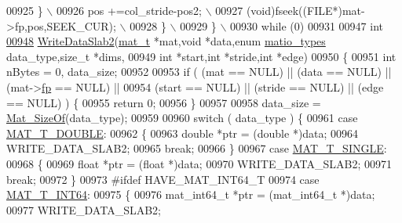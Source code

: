 \begin{DoxyCode}
{{{{00925 \textcolor{preprocessor}{            \} \(\backslash\)}
00926 \textcolor{preprocessor}{            pos +=col\_stride-pos2; \(\backslash\)}
00927 \textcolor{preprocessor}{            (void)fseek((FILE*)mat->fp,pos,SEEK\_CUR); \(\backslash\)}
00928 \textcolor{preprocessor}{        \} \(\backslash\)}
00929 \textcolor{preprocessor}{    \} \(\backslash\)}
00930 \textcolor{preprocessor}{    while (0)}
00931 
00947 \textcolor{keywordtype}{int}
\hyperlink{mat5_8c_a04eba34668a0de871c4f245702f802f7}{00948} \hyperlink{mat5_8c_a04eba34668a0de871c4f245702f802f7}{WriteDataSlab2}(\hyperlink{struct__mat__t}{mat\_t} *mat,\textcolor{keywordtype}{void} *data,\textcolor{keyword}{enum} \hyperlink{group___m_a_t_gacf7b3b879282b7ab3a51190e49bf3453}{matio\_types} data\_type,\textcolor{keywordtype}{size\_t} *dims,
00949     \textcolor{keywordtype}{int} *start,\textcolor{keywordtype}{int} *stride,\textcolor{keywordtype}{int} *edge)
00950 \{
00951     \textcolor{keywordtype}{int} nBytes = 0, data\_size;
00952 
00953     \textcolor{keywordflow}{if} ( (mat   == NULL) || (data   == NULL) || (mat->\hyperlink{struct__mat__t_a85f562e407ca9ad4d2a6e14f839432b7}{fp} == NULL) ||
00954          (start == NULL) || (stride == NULL) || (edge    == NULL) ) \{
00955         \textcolor{keywordflow}{return} 0;
00956     \}
00957 
00958     data\_size = \hyperlink{group__mat__util_gab6774aabdc124c540c1e7686d0804940}{Mat\_SizeOf}(data\_type);
00959 
00960     \textcolor{keywordflow}{switch} ( data\_type ) \{
00961         \textcolor{keywordflow}{case} \hyperlink{group___m_a_t_ggacf7b3b879282b7ab3a51190e49bf3453a31e721ecf7e188196f83c32838288797}{MAT\_T\_DOUBLE}:
00962         \{
00963             \textcolor{keywordtype}{double} *ptr = (\textcolor{keywordtype}{double} *)data;
00964             WRITE\_DATA\_SLAB2;
00965             \textcolor{keywordflow}{break};
00966         \}
00967         \textcolor{keywordflow}{case} \hyperlink{group___m_a_t_ggacf7b3b879282b7ab3a51190e49bf3453a3a3657d40e9212c923d9b9d03531b64c}{MAT\_T\_SINGLE}:
00968         \{
00969             \textcolor{keywordtype}{float} *ptr = (\textcolor{keywordtype}{float} *)data;
00970             WRITE\_DATA\_SLAB2;
00971             \textcolor{keywordflow}{break};
00972         \}
00973 \textcolor{preprocessor}{#ifdef HAVE\_MAT\_INT64\_T}
00974         \textcolor{keywordflow}{case} \hyperlink{group___m_a_t_ggacf7b3b879282b7ab3a51190e49bf3453a9e825b5d18b8f946eaf2b4b57e51c145}{MAT\_T\_INT64}:
00975         \{
00976             mat\_int64\_t *ptr = (mat\_int64\_t *)data;
00977             WRITE\_DATA\_SLAB2;
}}}}
\end{DoxyCode}
